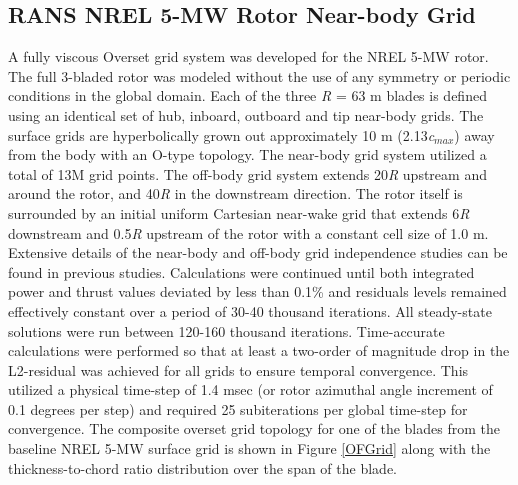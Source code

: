 \subsection{RANS NREL 5-MW Rotor Near-body Grid}\label{section5-3-3}
A fully viscous Overset grid system was developed for the NREL 5-MW rotor. The full 3-bladed rotor was modeled without the use of any symmetry or periodic conditions in the global domain. Each of the three \emph{R} = 63 m blades is defined using an identical set of hub, inboard, outboard and tip near-body grids. The surface grids are hyperbolically grown out approximately 10 m (2.13\emph{c$_{max}$}) away from the body with an O-type topology. The near-body grid system utilized a total of 13M grid points. The off-body grid system extends 20\emph{R}  upstream and around the rotor, and 40\emph{R}  in the downstream direction. The rotor itself is surrounded by an initial uniform Cartesian near-wake grid that extends 6\emph{R}  downstream and 0.5\emph{R}  upstream of the rotor with a constant cell size of 1.0 m. Extensive details of the near-body and off-body grid independence studies can be found in previous studies.\cite{steger1983,chan2009,chan2002} Calculations were continued until both integrated power and thrust values deviated by less than 0.1\% and residuals levels remained effectively constant over a period of 30-40 thousand iterations. All steady-state solutions were run between 120-160 thousand iterations. Time-accurate calculations were performed so that at least a two-order of magnitude drop in the L2-residual was achieved for all grids to ensure temporal convergence. This utilized a physical time-step of 1.4 msec (or rotor azimuthal angle increment of 0.1 degrees per step) and required 25 subiterations per global time-step for convergence. The composite overset grid topology for one of the blades from the baseline NREL 5-MW surface grid is shown in Figure \ref{OFGrid} along with the thickness-to-chord ratio distribution over the span of the blade. 

